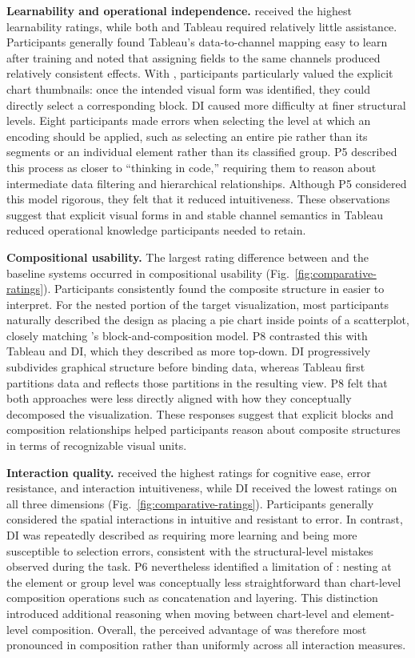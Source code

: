 \textbf{Learnability and operational independence.}
{\system} received the highest learnability ratings, while both {\system} and
Tableau required relatively little assistance. Participants generally found
Tableau's data-to-channel mapping easy to learn after training and noted that
assigning fields to the same channels produced relatively consistent effects.
With {\system}, participants particularly valued the explicit chart
thumbnails: once the intended visual form was identified, they could directly
select a corresponding block.
DI caused more difficulty at finer structural levels. Eight
participants made errors when selecting the level at which an encoding should
be applied, such as selecting an entire pie rather than its segments or an
individual element rather than its classified group. P5 described this process
as closer to ``thinking in code,'' requiring them to reason about intermediate
data filtering and hierarchical relationships. Although P5 considered this
model rigorous, they felt that it reduced intuitiveness. These observations
suggest that explicit visual forms in {\system} and stable channel semantics in
Tableau reduced operational knowledge participants needed to retain.



\textbf{Compositional usability.}
The largest rating difference between {\system} and the baseline systems
occurred in compositional usability
(Fig.~\ref{fig:comparative-ratings}). Participants consistently found the
composite structure in {\system} easier to interpret. For the nested portion of
the target visualization, most participants naturally described the design as
placing a pie chart inside points of a scatterplot, closely matching
{\system}'s block-and-composition model.
P8 contrasted this with Tableau and DI, which they described as
more top-down. DI progressively subdivides graphical structure
before binding data, whereas Tableau first partitions data and reflects those
partitions in the resulting view. P8 felt that both approaches were less
directly aligned with how they conceptually decomposed the visualization.
These responses suggest that explicit blocks and composition relationships
helped participants reason about composite structures in terms of recognizable
visual units.

\textbf{Interaction quality.}
{\system} received the highest ratings for cognitive ease, error resistance,
and interaction intuitiveness, while DI received the lowest
ratings on all three dimensions
(Fig.~\ref{fig:comparative-ratings}). Participants generally considered the
spatial interactions in {\system} intuitive and resistant to error. In
contrast, DI was repeatedly described as requiring more learning
and being more susceptible to selection errors, consistent with the
structural-level mistakes observed during the task.
P6 nevertheless identified a limitation of {\system}: nesting at the element
or group level was conceptually less straightforward than chart-level
composition operations such as concatenation and layering. This distinction
introduced additional reasoning when moving between chart-level and
element-level composition. Overall, the perceived advantage of {\system} was
therefore most pronounced in composition rather than uniformly across all
interaction measures.

